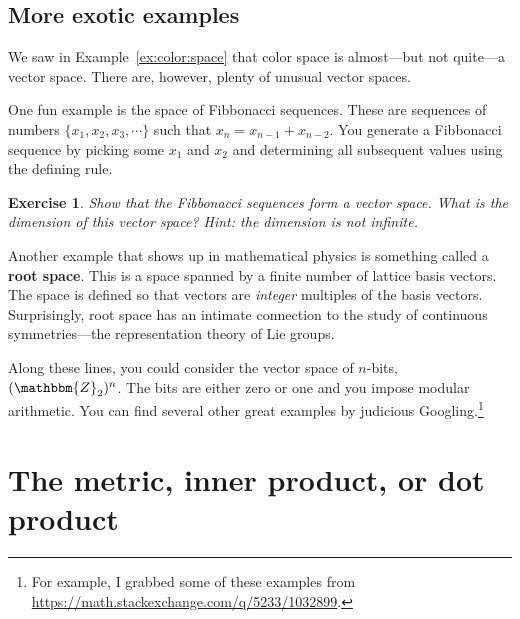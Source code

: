 \documentclass[
  11pt,
	colorful,
	raggedright,
]{tufte-style-thesis-flip}
\newtheorem{exercise}{Exercise}[section]
\begin{document}
\subsection{More exotic examples}
 
We saw in Example~\ref{ex:color:space} that color space is almost---but not quite---a vector space. There are, however, plenty of unusual vector spaces. 

One fun example is the space of Fibbonacci sequences. These are sequences of numbers $\{x_1, x_2, x_3, \cdots \}$ such that $x_n = x_{n-1} + x_{n-2}$. You generate a Fibbonacci sequence by picking some $x_1$ and $x_2$ and determining all subsequent values using the defining rule. 
\begin{exercise}
Show that the Fibbonacci sequences form a vector space. What is the dimension of this vector space? Hint: the dimension is \emph{not infinite}.
\end{exercise}

Another example that shows up in mathematical physics is something called a \textbf{root space}. This is a space spanned by a finite number of lattice basis vectors. The space is defined so that vectors are \emph{integer} multiples of the basis vectors. Surprisingly, root space has an intimate connection to the study of continuous symmetries---the representation theory of Lie groups. 

Along these lines, you could consider the vector space of $n$-bits, $(\mathbbm{Z}_2)^n$. The bits are either zero or one and you impose modular arithmetic. 
%
You can find several other great examples by judicious Googling.\footnote{For example, I grabbed some of these examples from \url{https://math.stackexchange.com/q/5233/1032899}.}



\section{The metric, inner product, or dot product}
\end{document}
